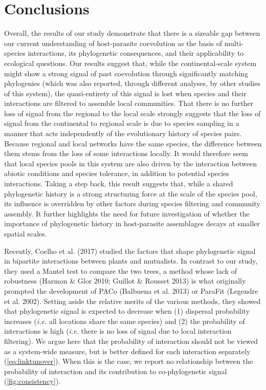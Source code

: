 \documentclass[11pt,serif]{article}
\begin{document}
\section{Conclusions}\label{conclusions}

Overall, the results of our study demonstrate that there is a sizeable
gap between our current understanding of host-parasite coevolution as
the basis of multi-species interactions, its phylogenetic consequences,
and their applicability to ecological questions. Our results suggest
that, while the continental-scale system might show a strong signal of
past coevolution through significantly matching phylogenies (which was
also reported, through different analyses, by other studies of this
system), the quasi-entirety of this signal is lost when species and
their interactions are filtered to assemble local communities. That
there is no further loss of signal from the regional to the local scale
strongly suggests that the loss of signal from the continental to
regional scale is due to species sampling in a manner that acts
independently of the evolutionary history of species pairs. Because
regional and local networks have the same species, the difference
between them stems from the loss of some interactions locally. It would
therefore seem that local species pools in this system are also driven
by the interaction between abiotic conditions and species tolerance, in
addition to potential species interactions. Taking a step back, this
result suggests that, while a shared phylogenetic history is a strong
structuring force at the scale of the species pool, its influence is
overridden by other factors during species filtering and community
assembly. It further highlights the need for future investigation of
whether the importance of phylogenetic history in host-parasite
assemblages decays at smaller spatial scales.

Recently, Coelho et al. (2017) studied the factors that shape
phylogenetic signal in bipartite interactions between plants and
mutualists. In contrast to our study, they used a Mantel test to compare
the two trees, a method whose lack of robustness (Harmon \& Glor 2010;
Guillot \& Rousset 2013) is what originally prompted the development of
PACo (Balbuena et al. 2013) or ParaFit (Legendre et al. 2002). Setting
aside the relative merits of the various methods, they showed that
phylogenetic signal is expected to decrease when (1) dispersal
probability increases (\emph{i.e.} all locations share the same species)
and (2) the probability of interactions is high (\emph{i.e.} there is no
loss of signal due to local interaction filtering). We argue here that
the probability of interaction should not be viewed as a system-wide
measure, but is better defined for each interaction separately
(\cref{eq:linktunover}). When this is the case, we report
no relationship between the probability of interaction and its
contribution to co-phylogenetic signal
(\cref{fig:consistency}).
\end{document}
